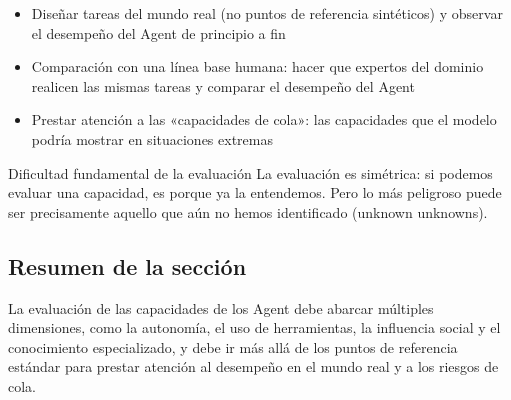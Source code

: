 \begin{itemize}
    \item Diseñar tareas del mundo real (no puntos de referencia sintéticos) y observar el desempeño del Agent de principio a fin
    \item Comparación con una línea base humana: hacer que expertos del dominio realicen las mismas tareas y comparar el desempeño del Agent
    \item Prestar atención a las «capacidades de cola»: las capacidades que el modelo podría mostrar en situaciones extremas
\end{itemize}

\begin{warningbox}{Dificultad fundamental de la evaluación}
La evaluación es simétrica: si podemos evaluar una capacidad, es porque ya la entendemos. Pero lo más peligroso puede ser precisamente aquello que aún no hemos identificado (unknown unknowns).
\end{warningbox}

\subsection{Resumen de la sección}

La evaluación de las capacidades de los Agent debe abarcar múltiples dimensiones, como la autonomía, el uso de herramientas, la influencia social y el conocimiento especializado, y debe ir más allá de los puntos de referencia estándar para prestar atención al desempeño en el mundo real y a los riesgos de cola.

